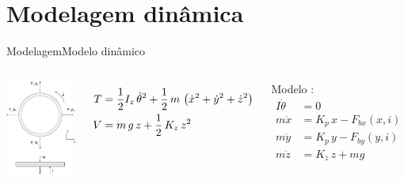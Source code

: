 \documentclass{beamer}
\begin{document}
\section{Modelagem dinâmica}

\begin{frame}{Modelagem}{Modelo dinâmico}
\begin{columns}
\centering
 	\includegraphics[width=0.9\linewidth]{Modelagem/forcas}

	 \begin{align*}
 	 T &= \frac{1}{2} I_z \, \dot{\theta}^2 + \frac{1}{2} \, m \, \left( \dot{x}^2 + \dot{y}^2 + \dot{z}^2 \right) \notag \\
 	 V &= m \, g \, z + \frac{1}{2} \, K_z \, z^2
 	 \end{align*}
 	 
 	Modelo : 
	\begin{align*}
 	I \ddot{\theta} &= 0 \\
 	m \ddot{x}		&= K_p \, x  - F_{bx}(x,i) \\
 	m \ddot{y}		&= K_p \, y  - F_{by}(y,i) \\	
 	m \ddot{z}  	&= K_z \, z + m g 
 	\end{align*}	 	 

\end{columns}	 	
\end{frame}
\end{document}
